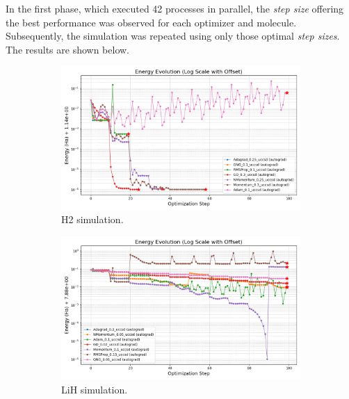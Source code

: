 In the first phase, which executed 42 processes in parallel, the \emph{step size} offering the best performance was observed for each optimizer and molecule. Subsequently, the simulation was repeated using only those optimal \emph{step sizes}. The results are shown below.

\begin{figure}[H]
  \centering
  \begin{subfigure}{0.32\textwidth}
    \includegraphics[width=\textwidth]{data/Optimizadores/final_results_H2/energy_evolution_log_offset.png}
    \caption{H2 simulation.}
    \label{fig:subimage1}
  \end{subfigure}
  \begin{subfigure}{0.32\textwidth}
    \includegraphics[width=\textwidth]{data/Optimizadores/final_results_LiH/energy_evolution_log_offset.png}
    \caption{LiH simulation.}
    \label{fig:subimage2}
  \end{subfigure}
  \begin{subfigure}{0.32\textwidth}

\end{subfigure}
\end{figure}
